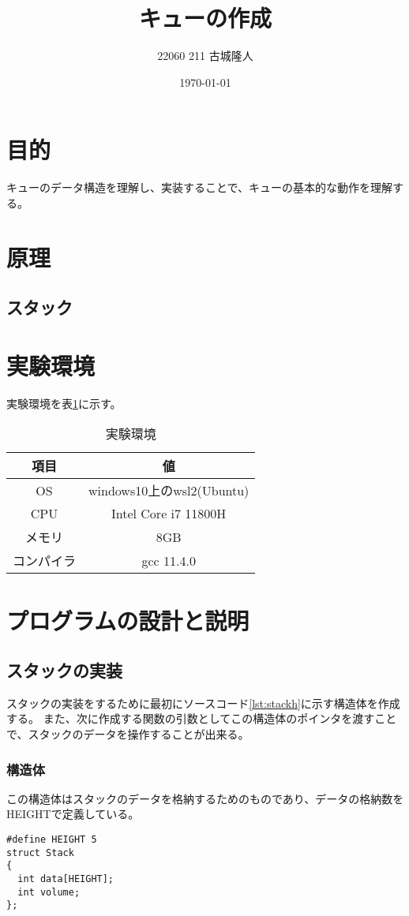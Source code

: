 \documentclass[dvipdfmx]{jsarticle}
\begin{document}
\title{キューの作成} 
\author{22060 211 古城隆人}
\date{\today}
\maketitle


\newpage


\section{目的}
キューのデータ構造を理解し、実装することで、キューの基本的な動作を理解する。
\section{原理}
\subsection{スタック}
\section{実験環境}
実験環境を表\ref{tab:environment}に示す。
\begin{table}[ht]
  \centering
  \begin{tabular}{|c|c|}
    \hline
    \textbf{項目} & \textbf{値}              \\
    \hline
    OS          & windows10上のwsl2(Ubuntu) \\
    \hline
    CPU         & Intel Core i7 11800H          \\
    \hline
    メモリ         & 8GB                     \\
    \hline
    コンパイラ       & gcc 11.4.0              \\
    \hline
  \end{tabular}
  \caption{実験環境}
  \label{tab:environment}
\end{table}
\section{プログラムの設計と説明}
\subsection{スタックの実装}
スタックの実装をするために最初にソースコード\ref{lst:stackh}に示す構造体を作成する。
また、次に作成する関数の引数としてこの構造体のポインタを渡すことで、スタックのデータを操作することが出来る。
\subsubsection{構造体}
この構造体はスタックのデータを格納するためのものであり、データの格納数をHEIGHTで定義している。
\begin{lstlisting}[caption={stack.h}, label={lst:stackh}]
#define HEIGHT 5
struct Stack
{
  int data[HEIGHT];
  int volume;
};
\end{lstlisting}
\end{document}
